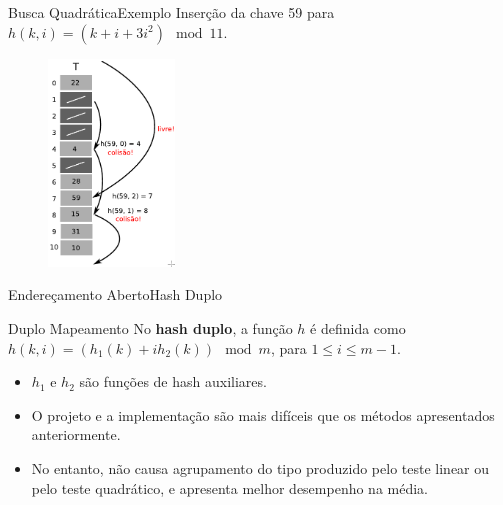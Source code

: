 \documentclass[aspectratio=169]{beamer}
\begin{document}
\begin{frame}{Busca Quadrática}{Exemplo}
Inserção da chave 59 para $h(k, i) = (k + i + 3i^2 ) \mod 11$.
\begin{figure}[!h]
  \centering
  \includegraphics[width=95pt]{imagens/ex_end_aberto_quadratico8.png}
  \label{fig_ex_end_aberto_quadratico8}
\end{figure}
\end{frame}


\begin{frame}{Endereçamento Aberto}{Hash Duplo}
\begin{block}{Duplo Mapeamento}
No {\bf hash duplo}, a função $h$ é definida como $h(k, i) = (h_1 (k) + i h_2 (k)) \mod m$, para $1 \leq i \leq m-1$.
\end{block}
\begin{itemize}
\item $h_1$ e $h_2$ são funções de hash auxiliares.
\item O projeto e a implementação são mais difíceis que os métodos apresentados anteriormente.
\item No entanto, não causa agrupamento do tipo produzido pelo teste linear ou pelo teste quadrático, e apresenta
melhor desempenho na média.
\end{itemize}
\end{frame}
\end{document}
